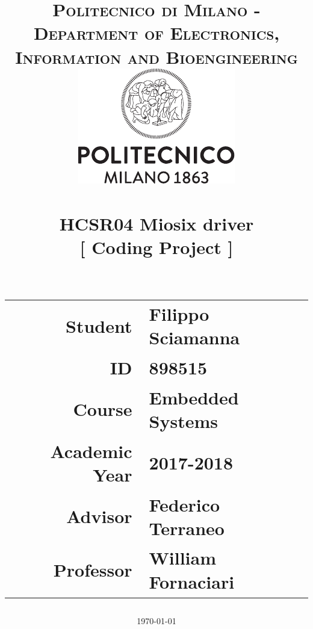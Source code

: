 \documentclass[12pt, english]{scrartcl}
\title{\normalfont \normalsize 
\textsc{Politecnico di Milano - Department of Electronics, Information and Bioengineering} \\[1cm]
\includegraphics[scale=1.2]{polimi} \\[1cm]
\horrule{0.5pt} \\[0.4cm]
\huge \textbf{HCSR04 Miosix driver} \\[.5cm] %
\large [ Coding Project ] \\ %
\horrule{2pt} \\[0.5cm]
\vfill
\author{}
\begin{tabular}{r l}
\textbf{Student} & Filippo Sciamanna \\
\textbf{ID} & 898515 \\[0.5cm]
\textbf{Course} & Embedded Systems \\
\textbf{Academic Year} & 2017-2018 \\[0.5cm]
\textbf{Advisor} & Federico Terraneo \\ %
\textbf{Professor} & William Fornaciari \\
\end{tabular}
\date{\normalsize\today}
}
\begin{document}
\maketitle %

\pagebreak\tableofcontents\pagebreak

%



\pagebreak


\end{document}
